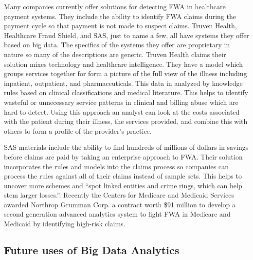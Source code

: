 \documentclass[sigconf]{acmart}
\begin{document}
Many companies currently offer solutions for detecting FWA in healthcare payment systems. 
They include the ability to identify FWA claims during the payment cycle so that payment 
is not made to suspect claims.  Truven Health\cite{TruvenHealth}, Healthcare Fraud Shield\cite{FraudShield}, 
and SAS\cite{SASHealth}, just to name a few, all have systems they offer based on big data.  The 
specifics of the systems they offer are proprietary in nature so many of the descriptions are 
generic.  Truven Health claims their solution mixes technology and healthcare intelligence.  They 
have a model which groups services together for form a picture of the full view of the illness 
including inpatient, outpatient, and pharmaceuticals. This data in analyzed by knowledge rules based 
on clinical classifications and medical literature.  This helps to identify wasteful or unnecessary 
service patterns in clinical and billing abuse which are hard to detect.  Using this approach 
an analyst can look at the costs associated with the patient during their illness, the services 
provided, and combine this with others to form a profile of the provider's practice.\cite{TruvenHealth}

SAS materials include the ability to find hundreds of millions of dollars in savings before 
claims are paid by taking an enterprise approach to FWA.\cite{SASHealth}  Their solution 
incorporates the rules and models into the claims process so companies can process the rules 
against all of their claims instead of sample sets.  This helps to uncover more schemes and 
``spot linked entities and crime rings, which can help stem larger losses.''\cite{SASFraud}.  
Recently the Centers for Medicare and Medicaid Services awarded Northrop Grumman Corp. a contract 
worth \$91 million to develop a second generation advanced analytics system to fight FWA in 
Medicare and Medicaid by identifying high-risk claims.\cite{ModernHealthcare}

\subsection{Future uses of Big Data Analytics}
\end{document}
